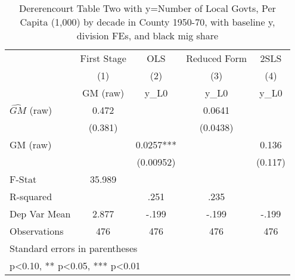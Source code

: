 \begin{table}[htbp]\centering
\def\sym#1{\ifmmode^{#1}\else\(^{#1}\)\fi}
\caption{Dererencourt Table Two with y=Number of Local Govts, Per Capita (1,000) by decade in County 1950-70, with baseline y, division FEs, and black mig share}
\begin{tabular}{l*{4}{c}}
\toprule
                    & First Stage   &         OLS   &Reduced Form   &        2SLS   \\
                    &\multicolumn{1}{c}{(1)}&\multicolumn{1}{c}{(2)}&\multicolumn{1}{c}{(3)}&\multicolumn{1}{c}{(4)}\\
                    &\multicolumn{1}{c}{GM  (raw)}&\multicolumn{1}{c}{y\_L0}&\multicolumn{1}{c}{y\_L0}&\multicolumn{1}{c}{y\_L0}\\
\midrule
$\hat{GM}$ (raw)    &       0.472   &               &      0.0641   &               \\
                    &     (0.381)   &               &    (0.0438)   &               \\
\addlinespace
GM  (raw)           &               &      0.0257***&               &       0.136   \\
                    &               &   (0.00952)   &               &     (0.117)   \\
\midrule
F-Stat              &      35.989   &               &               &               \\
R-squared           &               &        .251   &        .235   &               \\
Dep Var Mean        &       2.877   &       -.199   &       -.199   &       -.199   \\
Observations        &         476   &         476   &         476   &         476   \\
\bottomrule
\multicolumn{5}{l}{\footnotesize Standard errors in parentheses}\\
\multicolumn{5}{l}{\footnotesize * p<0.10, ** p<0.05, *** p<0.01}\\
\end{tabular}
\end{table}
